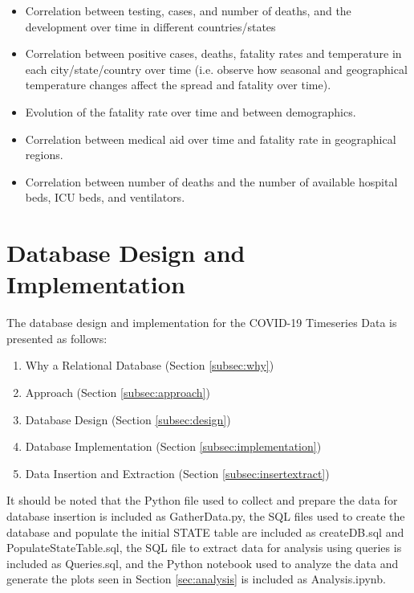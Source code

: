 \documentclass[11pt]{article}
\begin{document}
\begin{itemize}
    \item Correlation between testing, cases, and number of deaths, and the development over time in different countries/states
    \item Correlation between positive cases, deaths, fatality rates and temperature in each city/state/country over time (i.e. observe how seasonal and geographical temperature changes affect the spread and fatality over time).
    \item Evolution of the fatality rate over time and between demographics.
    \item Correlation between medical aid over time and fatality rate in geographical regions.
    \item Correlation between number of deaths and the number of available hospital beds, ICU beds, and ventilators.
\end{itemize}

\pagebreak

\section{Database Design and Implementation}

\noindent
The database design and implementation for the COVID-19 Timeseries Data is presented as follows:

\begin{enumerate}[1)]
    \item Why a Relational Database (Section \ref{subsec:why})
    \item Approach (Section \ref{subsec:approach})
    \item Database Design (Section \ref{subsec:design})
    \item Database Implementation (Section \ref{subsec:implementation})
    \item Data Insertion and Extraction (Section \ref{subsec:insertextract})
\end{enumerate}

\noindent
It should be noted that the Python file used to collect and prepare the data for database insertion is included as GatherData.py, the SQL files used to create the database and populate the initial STATE table are included as createDB.sql and PopulateStateTable.sql, the SQL file to extract data for analysis using queries is included as Queries.sql, and the Python notebook used to analyze the data and generate the plots seen in Section \ref{sec:analysis} is included as Analysis.ipynb.
\end{document}
